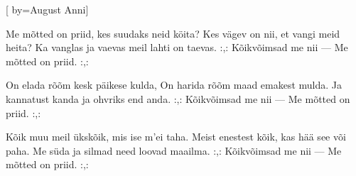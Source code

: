 [
	by={August Anni}]

\beginverse
Me mõtted on priid,
kes suudaks neid köita?
Kes vägev on nii,
et vangi meid heita?
Ka vanglas ja vaevas
meil lahti on taevas.
:,: Kõikvõimsad me nii —
Me mõtted on priid. :,: 
\endverse

\beginverse
On elada rõõm
kesk päikese kulda,
On harida rõõm
maad emakest mulda.
Ja kannatust kanda
ja ohvriks end anda.
:,: Kõikvõimsad me nii —
Me mõtted on priid. :,: 
\endverse

\beginverse
Kõik muu meil ükskõik,
mis ise m'ei taha.
Meist enestest kõik,
kas hää see või paha.
Me süda ja silmad
need loovad maailma.
:,: Kõikvõimsad me nii —
Me mõtted on priid. :,: 
\endverse
\endsong